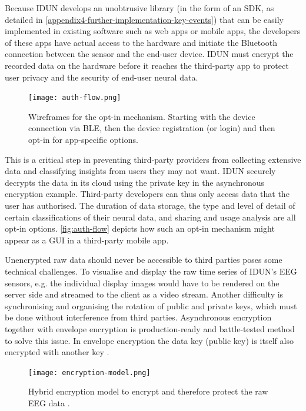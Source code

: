 Because IDUN develops an unobtrusive library (in the form of an SDK, as detailed in \autoref{appendix4-further-implementation-key-events}) that can be easily implemented in existing software such as web apps or mobile apps, the developers of these apps have actual access to the hardware and initiate the Bluetooth connection between the sensor and the end-user device. IDUN must encrypt the recorded data on the hardware before it reaches the third-party app to protect user privacy and the security of end-user neural data.

\begin{figure}[!ht]
  \centering
  \texttt{[image: auth-flow.png]}
  \caption{Wireframes for the opt-in mechanism. Starting with the device connection via BLE, then the device registration (or login) and then opt-in for app-specific options.}
  \label{fig:auth-flow}
\end{figure}

This is a critical step in preventing third-party providers from collecting extensive data and classifying insights from users they may not want. IDUN securely decrypts the data in its cloud using the private key in the asynchronous encryption example. Third-party developers can thus only access data that the user has authorised. The duration of data storage, the type and level of detail of certain classifications of their neural data, and sharing and usage analysis are all opt-in options. \autoref{fig:auth-flow} depicts how such an opt-in mechanism might appear as a GUI in a third-party mobile app.

Unencrypted raw data should never be accessible to third parties poses some technical challenges. To visualise and display the raw time series of IDUN's EEG sensors, e.g. the individual display images would have to be rendered on the server side and streamed to the client as a video stream. Another difficulty is synchronising and organising the rotation of public and private keys, which must be done without interference from third parties. Asynchronous encryption together with envelope encryption is production-ready and battle-tested method to solve this issue. In envelope encryption the data key (public key) is itself also encrypted with another key \citep{google_cloud_envelope_nodate}.

\begin{figure}[!ht]
  \centering
  \texttt{[image: encryption-model.png]}
  \caption[Hybrid encryption model to encrypt and therefore protect the raw EEG data]{Hybrid encryption model to encrypt and therefore protect the raw EEG data \citep{idun_guardian_nodate}.}
  \label{fig:encryption-model}
\end{figure}

